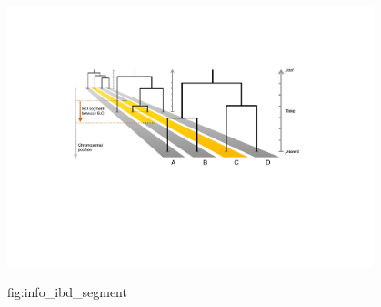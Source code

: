 

\begin{figure}[!htb]
\centering
\includegraphics[width=0.95\textwidth]{./img/ch1/info_ibd_segment}
{

}
{fig:info_ibd_segment}
\end{figure}
